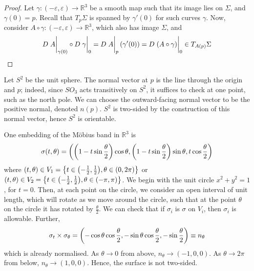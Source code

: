 \begin{proof}
	Let \( \gamma \colon (-\varepsilon, \varepsilon) \to \mathbb R^3 \) be a smooth map such that its image lies on \( \Sigma \), and \( \gamma(0) = p \).
	Recall that \( T_p \Sigma \) is spanned by \( \gamma'(0) \) for such curves \( \gamma \).
	Now, consider \( A \circ \gamma \colon (-\varepsilon, \varepsilon) \to \mathbb R^3 \), which also has image \( \Sigma \), and
	\[
		D \eval{A}_{\gamma(0)} \circ D \eval{\gamma}_0 = D \eval{A}_p \qty(\gamma'(0)) = D \eval{(A \circ \gamma)}_0 \in T_{A(p)} \Sigma
	\]
\end{proof}
\begin{example}
	Let \( S^2 \) be the unit sphere.
	The normal vector at \( p \) is the line through the origin and \( p \); indeed, since \( SO_3 \) acts transitively on \( S^2 \), it suffices to check at one point, such as the north pole.
	We can choose the outward-facing normal vector to be the positive normal, denoted \( n(p) \).
	\( S^2 \) is two-sided by the construction of this normal vector, hence \( S^2 \) is orientable.
\end{example}
\begin{example}
	One embedding of the M\"obius band in \( \mathbb R^3 \) is
	\[
		\sigma(t,\theta) = \qty(\qty(1 - t \sin \frac{\theta}{2})\cos \theta, \qty(1 - t \sin \frac{\theta}{2})\sin \theta, t \cos \frac{\theta}{2})
	\]
	where \( (t,\theta) \in V_1 = \qty{t \in \qty(-\frac{1}{2}, \frac{1}{2}), \theta \in (0,2\pi)} \) or \( (t,\theta) \in V_2 = \qty{t \in \qty(-\frac{1}{2}, \frac{1}{2}), \theta \in (-\pi, \pi)} \).
	We begin with the unit circle \( x^2 + y^2 = 1 \), for \( t = 0 \).
	Then, at each point on the circle, we consider an open interval of unit length, which will rotate as we move around the circle, such that at the point \( \theta \) on the circle it has rotated by \( \frac{\theta}{2} \).
	We can check that if \( \sigma_i \) is \( \sigma \) on \( V_i \), then \( \sigma_i \) is allowable.
	Further,
	\[
		\sigma_t \times \sigma_\theta = \qty(-\cos\theta \cos\frac{\theta}{2}, -\sin\theta \cos\frac{\theta}{2}, -\sin\frac{\theta}{2}) \equiv n_\theta
	\]
	which is already normalised.
	As \( \theta \to 0 \) from above, \( n_\theta \to (-1,0,0) \).
	As \( \theta \to 2\pi \) from below, \( n_\theta \to (1,0,0) \).
	Hence, the surface is not two-sided.
\end{example}
